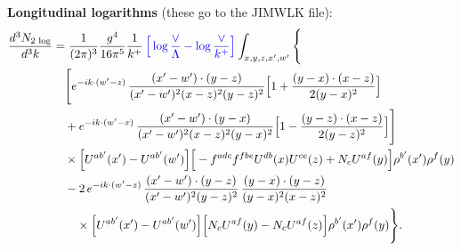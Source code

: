 \documentclass[10pt]{article}
\numberwithin{equation}{section}
\begin{document}
\textbf{Longitudinal logarithms} (these go to the JIMWLK file):
\begin{align}
\frac{d^{3}N_{2\,\log}}{d^{3}k}&=\frac{1}{(2\pi)^{3}}\frac{g^{4}}{16\pi^{5}}\frac{1}{k^{+}}\,{\color{blue}\Big[\log\frac{\vee}{\Lambda}-\log\frac{\vee}{k^{+}}\Big]}\int_{x,y,z,x',w'}\Bigg\{\notag\\&\quad\Bigg[e^{-ik\cdot(w'-z)}\,\frac{(x'-w')\cdot(y-z)}{(x'-w')^{2}(x-z)^{2}(y-z)^{2}}\Big[1+\frac{(y-x)\cdot(x-z)}{2(y-x)^{2}}\Big]\notag\\
&\quad+e^{-ik\cdot(w'-x)}\,\frac{(x'-w')\cdot(y-x)}{(x'-w')^{2}(x-z)^{2}(y-x)^{2}}\Big[1-\frac{(y-z)\cdot(x-z)}{2(y-z)^{2}}\Big]\Bigg]\notag\\&\quad\times\Big[U^{ab'}(x')-U^{ab'}(w')\Big]\Big[-f^{adc}f^{fbe}U^{db}(x)U^{ce}(z)+N_{c}U^{af}(y)\Big]\rho^{b'}(x')\rho^{f}(y)\notag\\
&\quad-2\,e^{-ik\cdot(w'-z)}\,\frac{(x'-w')\cdot(y-z)}{(x'-w')^{2}(y-z)^{2}}\,\frac{(y-x)\cdot(y-z)}{(y-x)^{2}(x-z)^{2}}\notag\\&\qquad\times\Big[U^{ab'}(x')-U^{ab'}(w')\Big]\Big[N_{c}U^{af}(y)-N_{c}U^{af}(z)\Big]\rho^{b'}(x')\rho^{f}(y)\Bigg\}.
\label{eq:finlog}
\end{align}
\end{document}
